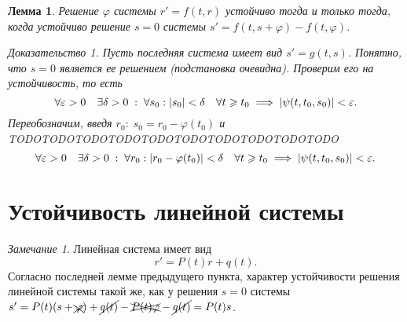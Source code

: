\documentclass[a5paper, 10pt]{article}
\theoremstyle{definition}
\theoremstyle{plain}
\newtheorem{Lem}{Лемма}
\theoremstyle{remark}
\newtheorem*{Note}{Замечание}
\newtheorem*{Proof}{Доказательство}
\begin{document}
	\begin{Lem}
		Решение $\varphi$ системы $r'=f(t,r)$ устойчиво тогда и только тогда, когда устойчиво решение $s=0$ системы $s'=f(t,s+\varphi) - f(t,\varphi)$.
		\begin{Proof}
			Пусть последняя система имеет вид $s'=g(t,s)$. Понятно, что $s=0$ является ее решением (подстановка очевидна). Проверим его на устойчивость, то есть 
			\[
			\forall \varepsilon >0 \quad \exists \delta >0 \;:\; \forall s_0: \left|s_0\right|<\delta  \quad \forall t \geqslant t_0 \implies \left|\psi(t,t_0, s_0)\right|<\varepsilon.
			\]
			Переобозначим, введя $r_0:\; s_0 = r_0-\varphi(t_0)$ и TODOTODOTODOTODOTODOTODOTODOTODOTODOTODO
			\[
			\forall \varepsilon >0 \quad \exists \delta >0 \;:\; \forall r_0: \left|r_0-\varphi(t_0)\right|<\delta  \quad \forall t \geqslant t_0 \implies \left|\psi(t,t_0, s_0)\right|<\varepsilon. 
			\]
		\end{Proof}
	\end{Lem}
	
	\section{Устойчивость линейной системы}
	\begin{Note}
		Линейная система имеет вид 
		\[
		r' = P(t) r + q(t).
		\]
		Согласно последней лемме предыдущего пункта, характер устойчивости решения линейной системы такой же, как у решения $s=0$ системы $s'=P(t) (s+\xcancel{\varphi}) + \cancel{q(t)} - \xcancel{P(t) \varphi }- \cancel{q(t)} = P(t) s$.
	\end{Note}
\end{document}
